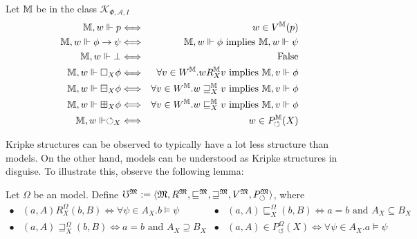 \begin{definition}
  Let $\mathbbm{M}$ be in the class $\mathcal{K}_{\Phi, \mathcal{A}, I}$
  \begin{eqnarray*}
    \mathbbm{M}, w \Vdash p & \Longleftrightarrow & w \in V^{\mathbbm{M}}
    (p)\\
    \mathbbm{M}, w \Vdash \phi \rightarrow \psi & \Longleftrightarrow &
    \mathbbm{M}, w \Vdash \phi \text{ implies } \mathbbm{M}, w \Vdash \psi\\
    \mathbbm{M}, w \Vdash \bot & \Longleftrightarrow & \text{False}\\
    \mathbbm{M}, w \Vdash \Box_X \phi & \Longleftrightarrow & \forall v \in
    W^{\mathbbm{M}} . w R^{\mathbbm{M}}_X v \text{ implies } \mathbbm{M}, v
    \Vdash \phi\\
    \mathbbm{M}, w \Vdash \boxminus_X \phi & \Longleftrightarrow & \forall v
    \in W^{\mathbbm{M}} . w \sqsupseteq^{\mathbbm{M}}_X v \text{ implies }
    \mathbbm{M}, v \Vdash \phi\\
    \mathbbm{M}, w \Vdash \boxplus_X \phi & \Longleftrightarrow & \forall v
    \in W^{\mathbbm{M}} . w \sqsubseteq^{\mathbbm{M}}_X v \text{ implies }
    \mathbbm{M}, v \Vdash \phi\\
    \mathbbm{M}, w \Vdash \circlearrowleft_X & \Longleftrightarrow & w \in
    P_{\circlearrowleft}^{\mathbbm{M}} (X)
  \end{eqnarray*}
\end{definition}
Kripke structures can be observed to typically have a lot less structure than
 models.  On the other hand, 
 models can be understood as
Kripke structures in disguise.  To illustrate this, observe the following
lemma:
\begin{definition}
Let $\Omega$ be an  model.  Define
  $\mho^{\Omega} \assign \langle \Omega, R^{\Omega},
  \sqsubseteq^{\Omega}, \sqsupseteq^{\Omega}, V^{\Omega},
  P_{\circlearrowleft}^{\Omega} \rangle$, where
  \[ \begin{array}{llll}
       \bullet & \text{$(a, A) R^{\Omega}_X (b, B) \Longleftrightarrow \forall
       \psi \in A_X .b \models \psi$} & \bullet & (a, A)
       \sqsubseteq^{\Omega}_X (b, B) \Longleftrightarrow a = b \text{ and }
       A_X \subseteq B_X\\
       \bullet & (a, A) \sqsupseteq^{\Omega}_X (b, B) \Longleftrightarrow a =
       b \text{ and } A_X \supseteq B_X & \bullet & (a, A) \in
       P_{\circlearrowleft}^{\Omega} (X) \Longleftrightarrow \forall \psi \in
       A_X .a \models \psi
     \end{array} \]
\end{definition}
